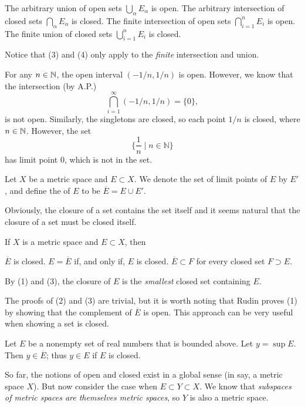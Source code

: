 \documentclass{article}
\begin{document}
\begin{theorem}
    \listhack 
    \begin{enumerate}
        \ii The arbitrary union of open sets $\bigcup_{\alpha}E_{\alpha}$ is open.
        \ii The arbitrary intersection of closed sets $\bigcap_{\alpha}E_{\alpha}$ is closed.
        \ii The finite intersection of open sets $\bigcap_{i=1}^{n}E_{i}$ is open.
        \ii The finite union of closed sets $\bigcup_{i=1}^{n}E_{i}$ is closed.
    \end{enumerate}
\end{theorem}
\begin{example}
    Notice that (3) and (4) only apply to the \textit{finite} intersection and union.
    \begin{enumerate}
        \ii For any $n\in\mathbb N$, the open interval $(-1/n,1/n)$ is open. However, we know that the intersection (by A.P.) \[\bigcap_{i=1}^{\infty}(-1/n,1/n)=\{0\},\]is not open.
        \ii Similarly, the singletons are closed, so each point $1/n$ is closed, where $n\in\mathbb N$. However, the set \[\{\frac{1}{n}\mid n\in\mathbb{N}\}\] has limit point 0, which is not in the set.
    \end{enumerate}
\end{example}
\begin{definition}
    Let $X$ be a metric space and $E\subset X$. We denote the set of limit points of $E$ by $E'$, and define the  of $E$ to be $\overline{E}=E\cup E'$.
\end{definition}
Obviously, the closure of a set contains the set itself and it seems natural that the closure of a set must be closed itself. 
\begin{theorem}
    If $X$ is a metric space and $E\subset X$, then 
    \begin{enumerate}
        \ii $\overline{E}$ is closed.
        \ii $E=\overline{E}$ if, and only if, $E$ is closed.
        \ii $\overline{E}\subset F$ for every closed set $F\supset E$.
    \end{enumerate}
    By (1) and (3), the closure of $E$ is the \textit{smallest} closed set containing $E$.
\end{theorem}
\begin{remark}
    The proofs of (2) and (3) are trivial, but it is worth noting that Rudin proves (1) by showing that the complement of $\overline{E}$ is open. This approach can be very useful when showing a set is closed.
\end{remark}
\begin{theorem}
    Let $E$ be a nonempty set of real numbers that is bounded above. Let $y=\sup{E}$. Then $y\in \overline{E}$; thus $y\in E$ if $E$ is closed.
\end{theorem}
So far, the notions of open and closed exist in a global sense (in say, a metric space $X$). But now consider the case when $E\subset Y\subset X$. We know that \textit{subspaces of metric spaces are themselves metric spaces}, so $Y$ is also a metric space. 
\end{document}
